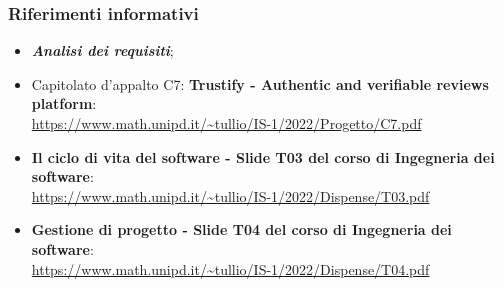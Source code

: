     \subsubsection{Riferimenti informativi}
    \begin{itemize}
        \item \textbf{\textit{Analisi dei requisiti}};
        \item Capitolato d'appalto C7: \textbf{Trustify - Authentic and verifiable reviews platform}: \\
        \url{https://www.math.unipd.it/~tullio/IS-1/2022/Progetto/C7.pdf}
        \item \textbf{Il ciclo di vita del software - Slide T03 del corso di Ingegneria dei software}: \\
        \url{https://www.math.unipd.it/~tullio/IS-1/2022/Dispense/T03.pdf}
        \item \textbf{Gestione di progetto - Slide T04 del corso di Ingegneria dei software}: \\
        \url{https://www.math.unipd.it/~tullio/IS-1/2022/Dispense/T04.pdf}
    \end{itemize}

